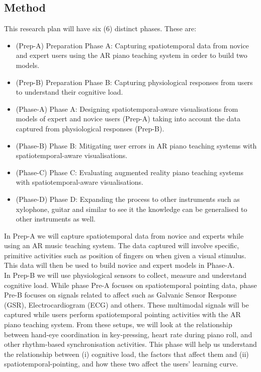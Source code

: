 \documentclass[manuscript,screen]{acmart}
\begin{document}
\subsection{Method}
This research plan will have six (6) distinct phases. These are:
\begin{itemize}
    \item (Prep-A) Preparation Phase A: Capturing spatiotemporal data from novice and expert users using the AR piano teaching system in order to build two models. 
    \item (Prep-B) Preparation Phase B: Capturing physiological responses from users to understand their cognitive load. 
    \item (Phase-A) Phase A: Designing spatiotemporal-aware visualisations from models of expert and novice users (Prep-A) taking into account the data captured from physiological responses (Prep-B).
    \item (Phase-B) Phase B: Mitigating user errors in AR piano teaching systems with spatiotemporal-aware visualisations.
    \item (Phase-C) Phase C: Evaluating augmented reality piano teaching systems with spatiotemporal-aware visualisations.
    \item (Phase-D) Phase D: Expanding the process to other instruments such as xylophone, guitar and similar to see it the knowledge can be generalised to other instruments as well. 
\end{itemize}

In Prep-A we will capture spatiotemporal data from novice and experts while using an AR music teaching system. The data captured will involve specific, primitive activities such as position of fingers on when given a visual stimulus. This data will then be used to build novice and expert models in Phase-A. \\

In Prep-B we will use physiological sensors to collect, measure and understand cognitive load. While phase Pre-A focuses on spatiotemporal pointing data, phase Pre-B focuses on signals related to affect such as Galvanic Sensor Response (GSR), Electrocardiogram (ECG) and others. These multimodal signals will be captured while users perform spatiotemporal pointing activities with the AR piano teaching system. From these setups, we will look at the relationship between hand-eye coordination in key-pressing, heart rate during piano roll, and other rhythm-based synchronisation activities. This phase will help us understand the relationship between (i) cognitive load, the factors that affect them and (ii) spatiotemporal-pointing, and how these two affect the users’ learning curve. \\
\end{document}
